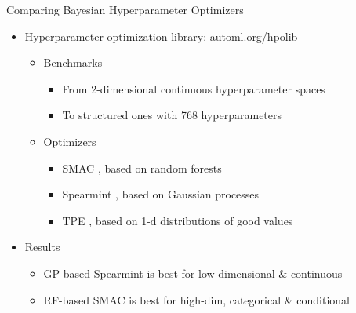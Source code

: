 \begin{frame}[c]{Comparing Bayesian Hyperparameter Optimizers}
\vspace*{-2cm}
{\centering{}}
\begin{itemize}
	\item Hyperparameter optimization library: \url{automl.org/hpolib}
	\begin{itemize}
		\item \alert{Benchmarks}
		\begin{itemize}
			\item From 2-dimensional continuous hyperparameter spaces
			\item To structured ones with 768 hyperparameters
		\end{itemize}
		\item \alert{Optimizers}
		\begin{itemize}
			\item SMAC  , based on random forests
			\item Spearmint  , based on Gaussian processes
			\item TPE  , based on 1-d distributions of good values
		\end{itemize}
	\end{itemize}
	\item Results
	\begin{itemize}
		\item GP-based Spearmint is best for \alert{low-dimensional \& continuous}
		\item RF-based SMAC is best for high-dim, \alert{categorical \& conditional}
	\end{itemize}
\end{itemize}
\end{frame}
